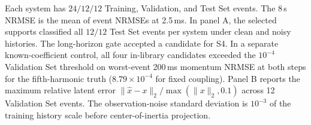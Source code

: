{\begin{table}[!t]
\parbox{\textwidth}{\footnotesize
Each system has $24/12/12$ Training, Validation, and Test Set events.
The 8\,s NRMSE is the mean of event NRMSEs at 2.5\,ms.
In panel A, the selected supports classified all $12/12$ Test Set events
per system under clean and noisy histories. The long-horizon gate accepted
a candidate for S4. In a separate known-coefficient control, all four
in-library candidates exceeded the $10^{-4}$ Validation Set threshold on
worst-event 200\,ms momentum NRMSE at both steps for the fifth-harmonic truth
($8.79\times10^{-4}$ for fixed coupling).
Panel B reports the maximum relative latent error
$\|\hat x-x\|_2/\max(\|x\|_2,0.1)$ across 12 Validation Set events.
The observation-noise standard deviation is $10^{-3}$ of the training
history scale before center-of-inertia projection.}
\end{table}%
}

